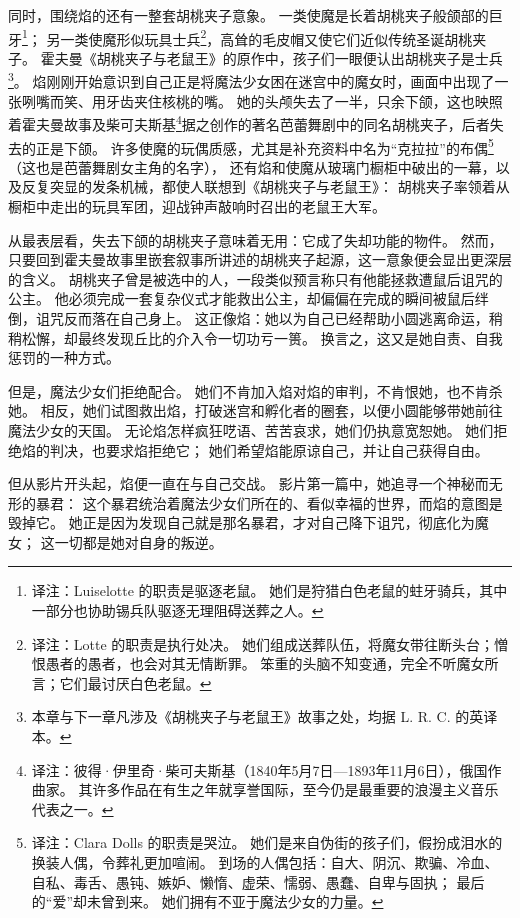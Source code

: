 同时，围绕焰的还有一整套胡桃夹子意象。
一类使魔是长着胡桃夹子般颌部的巨牙\footnote{%
    译注：Luiselotte 的职责是驱逐老鼠。
    她们是狩猎白色老鼠的蛀牙骑兵，其中一部分也协助锡兵队驱逐无理阻碍送葬之人。
}；
另一类使魔形似玩具士兵\footnote{%
    译注：Lotte 的职责是执行处决。
    她们组成送葬队伍，将魔女带往断头台；憎恨愚者的愚者，也会对其无情断罪。
    笨重的头脑不知变通，完全不听魔女所言；它们最讨厌白色老鼠。
}，高耸的毛皮帽又使它们近似传统圣诞胡桃夹子。
霍夫曼《胡桃夹子与老鼠王》的原作中，孩子们一眼便认出胡桃夹子是士兵\footnote{%
    本章与下一章凡涉及《胡桃夹子与老鼠王》故事之处，均据 L. R. C. 的英译本\cite{hoffmann-nodate-nutcracker-mouse-king}。
}。
焰刚刚开始意识到自己正是将魔法少女困在迷宫中的魔女时，画面中出现了一张咧嘴而笑、用牙齿夹住核桃的嘴。%
她的头颅失去了一半，只余下颌，这也映照着霍夫曼故事及柴可夫斯基\footnote{%
    译注：彼得·伊里奇·柴可夫斯基（1840年5月7日—1893年11月6日），俄国作曲家。
    其许多作品在有生之年就享誉国际，至今仍是最重要的浪漫主义音乐代表之一。
}据之创作的著名芭蕾舞剧中的同名胡桃夹子，后者失去的正是下颌。
许多使魔的玩偶质感，尤其是补充资料中名为“克拉拉”的布偶\footnote{%
    译注：Clara Dolls 的职责是哭泣。
    她们是来自伪街的孩子们，假扮成泪水的换装人偶，令葬礼更加喧闹。
    到场的人偶包括：自大、阴沉、欺骗、冷血、自私、毒舌、愚钝、嫉妒、懒惰、虚荣、懦弱、愚蠢、自卑与固执；
    最后的“爱”却未曾到来。
    她们拥有不亚于魔法少女的力量。
}\cite{magicaquartet2011production-note}（这也是芭蕾舞剧女主角的名字），
还有焰和使魔从玻璃门橱柜中破出的一幕，以及反复突显的发条机械，都使人联想到《胡桃夹子与老鼠王》：
胡桃夹子率领着从橱柜中走出的玩具军团，迎战钟声敲响时召出的老鼠王大军。

从最表层看，失去下颌的胡桃夹子意味着无用：它成了失却功能的物件。
然而，只要回到霍夫曼故事里嵌套叙事所讲述的胡桃夹子起源，这一意象便会显出更深层的含义。
胡桃夹子曾是被选中的人，一段类似预言称只有他能拯救遭鼠后诅咒的公主。
他必须完成一套复杂仪式才能救出公主，却偏偏在完成的瞬间被鼠后绊倒，诅咒反而落在自己身上。
这正像焰：她以为自己已经帮助小圆逃离命运，稍稍松懈，却最终发现丘比的介入令一切功亏一篑。
换言之，这又是她自责、自我惩罚的一种方式。

但是，魔法少女们拒绝配合。
她们不肯加入焰对焰的审判，不肯恨她，也不肯杀她。
相反，她们试图救出焰，打破迷宫和孵化者的圈套，以便小圆能够带她前往魔法少女的天国。
无论焰怎样疯狂呓语、苦苦哀求，她们仍执意宽恕她。
她们拒绝焰的判决，也要求焰拒绝它；
她们希望焰能原谅自己，并让自己获得自由。

但从影片开头起，焰便一直在与自己交战。
影片第一篇中，她追寻一个神秘而无形的暴君：
这个暴君统治着魔法少女们所在的、看似幸福的世界，而焰的意图是毁掉它。
她正是因为发现自己就是那名暴君，才对自己降下诅咒，彻底化为魔女；
这一切都是她对自身的叛逆。

